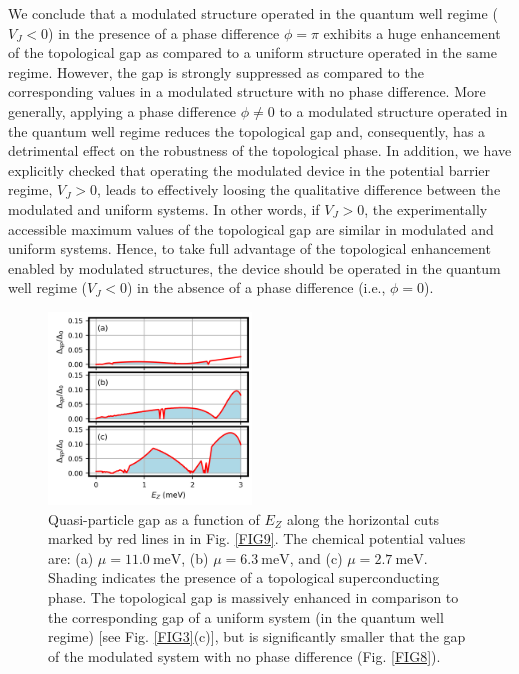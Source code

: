 \documentclass[twocolumn,aps,prb,nofootinbib]{revtex4-2}
\begin{document}
We conclude that  a modulated structure operated in the quantum well regime ($V_J < 0$) in the presence of a phase difference $\phi=\pi$ exhibits a huge enhancement of the topological gap as compared to a uniform structure operated in the same regime. However, the gap is strongly suppressed as compared to the corresponding values in a modulated structure with no phase difference. More generally, applying a phase difference $\phi \neq 0$ to a modulated structure operated in the quantum well regime reduces the topological gap and, consequently, has a detrimental effect on the robustness of the topological phase. In addition, we have explicitly checked that operating the modulated device in the potential barrier regime, $V_J >0$, leads to effectively loosing the qualitative difference between the modulated and uniform systems. In other words, if $V_J >0$, the experimentally accessible maximum values of the topological gap are similar in modulated and uniform systems. 
 Hence, to take full advantage of the topological enhancement enabled by modulated structures, the device should be operated in the quantum well regime ($V_J<0$) in the absence of a phase difference (i.e., $\phi=0$).

\begin{figure}[t]
\begin{center}
\includegraphics[width=0.48\textwidth]{Fig11.png}
\end{center}
\vspace{-3mm}
\caption{Quasi-particle gap as a function of $E_Z$ along the horizontal cuts marked by red lines in in Fig. \ref{FIG9}. The chemical potential values are: (a) $\mu = 11.0~\text{meV}$, (b) $\mu = 6.3~\text{meV}$,  and (c) $\mu = 2.7~\text{meV}$. Shading indicates the presence of a topological superconducting phase. The topological gap is massively enhanced in comparison to the corresponding gap of a uniform system (in the quantum well regime) [see Fig. \ref{FIG3}(c)], but is significantly smaller that the gap of the modulated system with no phase difference (Fig. \ref{FIG8}). }
\label{FIG11}
\vspace{-3mm}
\end{figure}
\end{document}
